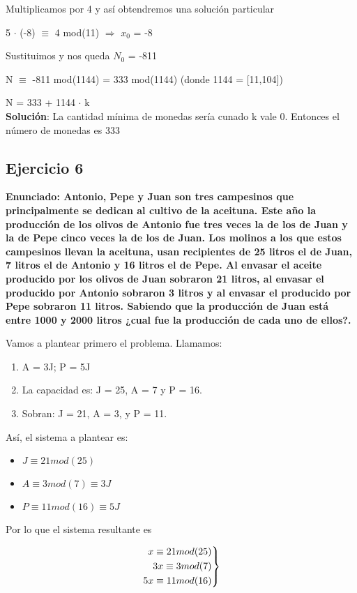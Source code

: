 \documentclass[11pt, a4paper, titlepage]{article}
\newenvironment{rcases}
  {\left.\begin{aligned}}
  {\end{aligned}\right\rbrace}
\begin{document}
Multiplicamos por 4 y así obtendremos una solución particular

5 $\cdot$ (-8) $\equiv$ 4 mod(11) $\Rightarrow$ $x_{0}$ = -8

Sustituimos y nos queda $N_{0}$ = -811 

N $\equiv$ -811 mod(1144) = 333 mod(1144) (donde 1144 = [11,104])

N = 333 + 1144 $\cdot$ k\\

\textbf{Solución}: La cantidad mínima de monedas sería cunado k vale 0. Entonces el número de monedas es 333\\


\subsection{\LARGE{Ejercicio 6}}
\textbf{Enunciado: Antonio, Pepe y Juan son tres campesinos que principalmente se
dedican al cultivo de la aceituna. Este año la producción de los olivos de
Antonio fue tres veces la de los de Juan y la de Pepe cinco veces la de los
de Juan. Los molinos a los que estos campesinos llevan la aceituna, usan
recipientes de 25 litros el de Juan, 7 litros el de Antonio y 16 litros el de
Pepe. Al envasar el aceite producido por los olivos de Juan sobraron 21
litros, al envasar el producido por Antonio sobraron 3 litros y al envasar el
producido por Pepe sobraron 11 litros. Sabiendo que la producción de Juan
está entre 1000 y 2000 litros ¿cual fue la producción de cada uno de ellos?.}

Vamos a plantear primero el problema. Llamamos:
\begin{enumerate}
	\item A = 3J; P = 5J
	\item La capacidad es: J = 25, A = 7 y P = 16.
	\item Sobran: J = 21, A = 3, y P = 11.
\end{enumerate}

Así, el sistema a plantear es:

\begin{itemize}
	\item $J \equiv 21 mod(25)$
	\item $A \equiv 3 mod(7) \equiv 3J$
	\item $P \equiv 11 mod(16) \equiv 5J$
\end{itemize}

Por lo que el sistema resultante es

\[
\begin{rcases}
	x \equiv 21 mod(25)\\
	3x \equiv 3 mod(7)\\
	5x \equiv 11 mod(16)
\end{rcases}
\]
\end{document}
